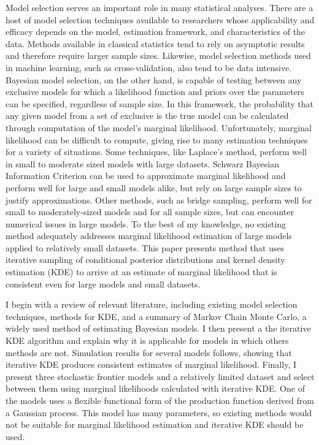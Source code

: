 \documentclass[twocolumn]{article}
\begin{document}
Model selection serves an important role in many statistical analyses. There are a host of model selection techniques available to researchers whose applicability and efficacy depends on the model, estimation framework, and characteristics of the data. Methods available in classical statistics tend to rely on asymptotic results and therefore require larger sample sizes. Likewise, model selection methods used in machine learning, such as cross-validation, also tend to be data intensive. Bayesian model selection, on the other hand, is capable of testing between any exclusive models for which a likelihood function and priors over the parameters can be specified, regardless of sample size. In this framework, the probability that any given model from a set of exclusive is the true model can be calculated through computation of the model's marginal likelihood. Unfortunately, marginal likelihood can be difficult to compute, giving rise to many estimation techniques for a variety of situations. Some techniques, like Laplace's method, perform well in small to moderate sized models with large datasets. Schwarz Bayesian Information Criterion can be used to approximate marginal likelihood and perform well for large and small models alike, but rely on large sample sizes to justify approximations. Other methods, such as bridge sampling, perform well for small to moderately-sized models and for all sample sizes, but can encounter numerical issues in large models. To the best of my knowledge, no existing method adequately addresses marginal likelihood estimation of large models applied to relatively small datasets. This paper presents method that uses iterative sampling of conditional posterior distributions and kernel density estimation (KDE) to arrive at an estimate of marginal likelihood that is consistent even for large models and small datasets.

I begin with a review of relevant literature, including existing model selection techniques, methods for KDE, and a summary of Markov Chain Monte Carlo, a widely used method of estimating Bayesian models. I then present a the iterative KDE algorithm and explain why it is applicable for models in which others methods are not. Simulation results for several models follows, showing that iterative KDE produces consistent estimates of marginal likelihood. Finally, I present three stochastic frontier models and a relatively limited dataset and select between them using marginal likelihoods calculated with iterative KDE. One of the models uses a flexible functional form of the production function derived from a Gaussian process. This model has many parameters, so existing methods would not be suitable for marginal likelihood estimation and iterative KDE should be used.
\end{document}
